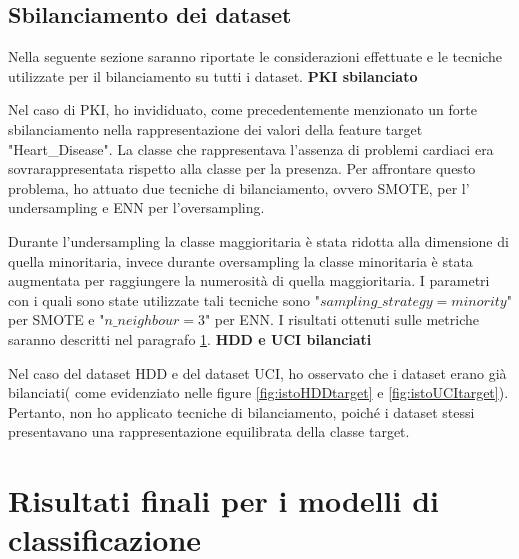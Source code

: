 \subsection{Sbilanciamento dei dataset} 
Nella seguente sezione saranno riportate le considerazioni effettuate e le tecniche utilizzate per il bilanciamento su tutti i dataset.
\newline
\textbf{PKI sbilanciato}
\begin{flushleft}
    
Nel caso di PKI, ho invididuato, come precedentemente menzionato un forte sbilanciamento  nella rappresentazione dei valori della feature target "Heart\_Disease". La classe che rappresentava l'assenza di problemi cardiaci era sovrarappresentata rispetto alla classe per la presenza. Per affrontare questo problema, ho attuato due tecniche di bilanciamento, ovvero SMOTE, per l' undersampling e ENN per l'oversampling.  




Durante l'undersampling la classe maggioritaria è stata ridotta alla dimensione di quella minoritaria, invece durante oversampling la classe minoritaria è stata augmentata per raggiungere la numerosità di quella maggioritaria. I parametri con i quali sono state utilizzate tali tecniche sono "$sampling\_strategy=minority$" per SMOTE e "$n\_neighbour=3$" per ENN.
I risultati ottenuti sulle metriche saranno descritti nel paragrafo \ref{sec:risultati}.  %
\newline
\textbf{HDD e UCI bilanciati}
\newline


Nel caso del dataset HDD e del dataset UCI, ho osservato che i dataset erano già bilanciati( come evidenziato nelle figure \ref{fig:istoHDDtarget} e \ref{fig:istoUCItarget}). Pertanto, non ho applicato  tecniche di bilanciamento, poiché i dataset stessi presentavano una rappresentazione equilibrata della classe target.



\section{Risultati finali per i modelli di classificazione }\label{sec:risultati}


\end{flushleft}
